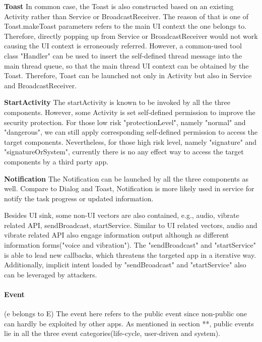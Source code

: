 \textbf{Toast}
In common case, the Toast is also constructed based on an existing Activity rather than Service or BroadcastReceiver. The reason of that is one of Toast.makeToast parameters refers to the main UI context the one belongs to. Therefore, directly popping up from Service or BroadcastReceiver would not work causing the UI context is erroneously referred. However, a common-used tool class "Handler" can be used to insert the self-defined thread message into the main thread queue, so that the main thread UI context can be obtained by the Toast. Therefore, Toast can be launched not only in Activity but also in Service and BroadcastReceiver.

\textbf{StartActivity}
The startActivity is known to be invoked by all the three components. However, some Activity is set self-defined permission to improve the security protection. For those low risk "protectionLevel", namely "normal" and "dangerous", we can still apply corresponding self-defined permission to access the target components. Nevertheless, for those high risk level, namely "signature" and "signatureOrSystem", currently there is no any effect way to access the target components by a third party app.

\textbf{Notification}
The Notification can be launched by all the three components as well. Compare to Dialog and Toast, Notification is more likely used in service for notify the task progress or updated information. 



Besides UI sink, some non-UI vectors are also contained, e.g., audio, vibrate related API, sendBroadcast, startService. Similar to UI related vectors, audio and vibrate related API also engage information output although as different information forms("voice and vibration"). The "sendBroadcast" and "startService" is able to lead new callbacks, which threatens the targeted app in a iterative way. Additionally, implicit intent loaded by "sendBroadcast" and "startService" also can be leveraged by attackers.

\paragraph{Event}

(e belongs to E) The event here refers to the public event since non-public one can hardly be exploited by other apps. As mentioned in section **, public events lie in all the three event categories(life-cycle, user-driven and system).

